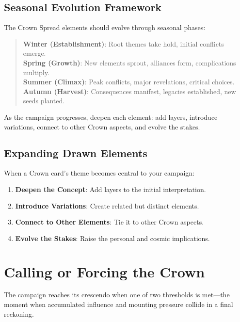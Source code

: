 \subsection{Seasonal Evolution Framework}
\label{subsec:crown-evolution}

The Crown Spread elements should evolve through seasonal phases:
\begin{quote}
  \textbf{Winter (Establishment)}: Root themes take hold, initial conflicts emerge.\\
  \textbf{Spring (Growth)}: New elements sprout, alliances form, complications multiply.\\
  \textbf{Summer (Climax)}: Peak conflicts, major revelations, critical choices.\\
  \textbf{Autumn (Harvest)}: Consequences manifest, legacies established, new seeds planted.
\end{quote}

As the campaign progresses, deepen each element: add layers, introduce variations, connect to other Crown aspects, and evolve the stakes.

\subsection{Expanding Drawn Elements}
\label{subsec:crown-expanding}

When a Crown card’s theme becomes central to your campaign:
\begin{enumerate}
  \item \textbf{Deepen the Concept}: Add layers to the initial interpretation.
  \item \textbf{Introduce Variations}: Create related but distinct elements.
  \item \textbf{Connect to Other Elements}: Tie it to other Crown aspects.
  \item \textbf{Evolve the Stakes}: Raise the personal and cosmic implications.
\end{enumerate}

\section{Calling or Forcing the Crown}
\label{sec:calling-crown}

The campaign reaches its crescendo when one of two thresholds is met—the moment when accumulated influence and mounting pressure collide in a final reckoning.


